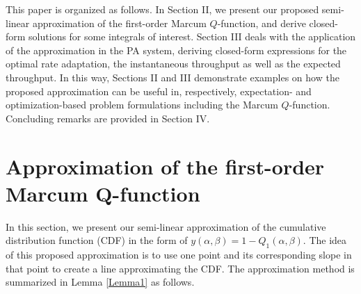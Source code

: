 This paper is organized as follows. In Section II, we present our proposed semi-linear approximation of the first-order Marcum $Q$-function, and derive closed-form solutions for some integrals of interest. Section III deals with the application of the approximation in the PA system,  deriving closed-form expressions for the optimal rate adaptation, the instantaneous throughput as well as the expected throughput.  In this way, Sections II and III demonstrate examples on how the proposed approximation can be useful in, respectively, expectation- and optimization-based problem formulations including the Marcum $Q$-function. Concluding remarks are provided in Section IV. 





\section{Approximation of the first-order Marcum Q-function}
In this section, we present our semi-linear approximation of the cumulative distribution function (CDF) in the form of $y(\alpha, \beta ) = 1-Q_1(\alpha,\beta)$. The idea of this proposed approximation is to use one point and its corresponding slope in that point to create a line  approximating the CDF. The approximation method is summarized in Lemma \ref{Lemma1} as follows.
